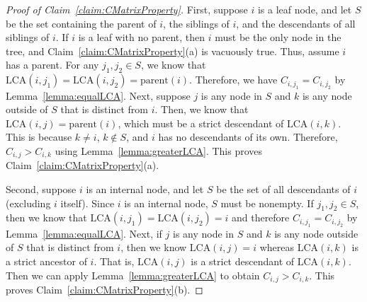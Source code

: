\documentclass{article}
\theoremstyle{definition}
\begin{document}
\begin{proof}[Proof of Claim~\ref{claim:CMatrixProperty}]
First, suppose $i$ is a leaf node, and let $S$ be the set containing the parent of $i$, the siblings of $i$, and the descendants of all siblings of $i$.
If $i$ is a leaf with no parent, then $i$ must be the only node in the tree, and Claim~\ref{claim:CMatrixProperty}(a) is vacuously true.
Thus, assume $i$ has a parent.
For any $j_1, j_2 \in S$, we know that $\text{LCA}(i, j_1) = \text{LCA}(i, j_2) = \text{parent}(i)$.
Therefore, we have $C_{i,j_1} = C_{i,j_2}$ by Lemma~\ref{lemma:equalLCA}.
Next, suppose $j$ is any node in $S$ and $k$ is any node outside of $S$ that is distinct from $i$.
Then, we know that $\text{LCA}(i,j) = \text{parent}(i)$, which must be a strict descendant of $\text{LCA}(i,k)$.
This is because $k \neq i$, $k \notin S$, and $i$ has no descendants of its own.
Therefore, $C_{i,j} > C_{i,k}$ using Lemma~\ref{lemma:greaterLCA}.
This proves Claim~\ref{claim:CMatrixProperty}(a).

Second, suppose $i$ is an internal node, and let $S$ be the set of all descendants of $i$ (excluding $i$ itself).
Since $i$ is an internal node, $S$ must be nonempty.
If $j_1, j_2 \in S$, then we know that $\text{LCA}(i, j_1) = \text{LCA}(i, j_2) = i$ and therefore $C_{i,j_1} = C_{i,j_2}$ by Lemma~\ref{lemma:equalLCA}.
Next, if $j$ is any node in $S$ and $k$ is any node outside of $S$ that is distinct from $i$, then we know $\text{LCA}(i,j) = i$ whereas $\text{LCA}(i,k)$ is a strict ancestor of $i$.
That is, $\text{LCA}(i,j)$ is a strict descendant of $\text{LCA}(i,k)$.
Then we can apply Lemma~\ref{lemma:greaterLCA} to obtain $C_{i,j} > C_{i,k}$.
This proves Claim~\ref{claim:CMatrixProperty}(b).
\end{proof}

\end{document}
